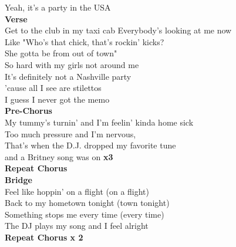Yeah, it's a party in the USA\\
\textbf{Verse}\\
Get to the club in my taxi cab Everybody's looking at me now\\
Like "Who's that chick, that's rockin' kicks?\\
She gotta be from out of town"\\
So hard with my girls not around me\\
It's definitely not a Nashville party\\
'cause all I see are stilettos\\
I guess I never got the memo\\
\textbf{Pre-Chorus}\\
My tummy's turnin' and I'm feelin' kinda home sick\\
Too much pressure and I'm nervous,\\
That's when the D.J. dropped my favorite tune\\
and a Britney song was on  \textbf{x3}\\
\textbf{Repeat Chorus}\\
\textbf{Bridge}\\
Feel like hoppin' on a flight (on a flight)\\
Back to my hometown tonight (town tonight)\\
Something stops me every time (every time)\\
The DJ plays my song and I feel alright\\
\textbf{Repeat Chorus x 2}\\
